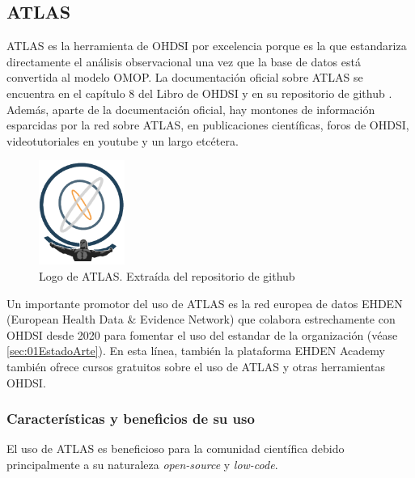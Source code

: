 \subsection{ATLAS} \label{subsec:05ATLAS}

ATLAS es la herramienta de OHDSI por excelencia porque es la que estandariza directamente el análisis observacional una vez que la base de datos está convertida al modelo OMOP. La documentación oficial sobre ATLAS se encuentra en el capítulo 8 del Libro de OHDSI y en su repositorio de github \cite{githubATLAS}. Además, aparte de la documentación oficial, hay montones de información esparcidas por la red sobre ATLAS, en publicaciones científicas, foros de OHDSI, videotutoriales en youtube y un largo etcétera.

\begin{figure}[H]
\centering
\includegraphics[width=0.25\textwidth]{figures/ATLASlogo.png}
     \caption{Logo de ATLAS. Extraída del repositorio de github \cite{githubATLAS}}
    \label{fig:ATLASlogo}
\end{figure}

Un importante promotor del uso de ATLAS es la red europea de datos EHDEN (European Health Data \& Evidence Network) \cite{ehden} que colabora estrechamente con OHDSI desde 2020 para fomentar el uso del estandar de la organización (véase \ref{sec:01EstadoArte}). En esta línea, también la plataforma EHDEN Academy también ofrece cursos gratuitos sobre el uso de ATLAS y otras herramientas OHDSI.

\subsubsection{Características y beneficios de su uso}

El uso de ATLAS es beneficioso para la comunidad científica debido principalmente a su naturaleza \textit{open-source} y \textit{low-code}. 

